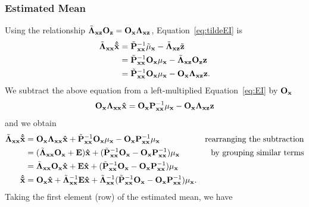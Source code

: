\subsubsection{Estimated Mean}
Using the relationship ${\tilde{\bf \Lambda}}_{\bf xz}{\bf O}_{\bf z}={\bf O}_{\bf x}{\bf \Lambda}_{\bf xz}$, Equation~\eqref{eq:tildeEI} is
\begin{equation}
\begin{split}
\tilde{\bf \Lambda}_{\bf xx}{\bf{\hat{\tilde x}}}&=\tilde{\bf P}_{\bf xx}^{-1}\tilde\mu_{\bf x}-\tilde{\bf \Lambda}_{\bf xz}\tilde{\bf z} \\
&=\tilde{\bf P}_{\bf xx}^{-1}{\bf O}_{\bf x}\mu_{\bf x}-\tilde{\bf \Lambda}_{\bf xz}{\bf O}_{\bf z}{\bf z} \\
&=\tilde{\bf P}_{\bf xx}^{-1}{\bf O}_{\bf x}\mu_{\bf x}-{\bf O}_{\bf x}{\bf \Lambda}_{\bf xz}{\bf z}. \\
\end{split}
\end{equation}
We subtract the above equation from a left-multiplied Equation~\eqref{eq:EI} by ${\bf O}_{\bf x}$
\begin{equation}
{\bf O}_{\bf x}{\bf \Lambda}_{\bf xx}{\bf{\hat x}}={\bf O}_{\bf x}{\bf P}_{\bf xx}^{-1}\mu_{\bf x}-{\bf O}_{\bf x}{\bf \Lambda}_{\bf xz}{\bf z}
\end{equation}
and we obtain
\begin{align*}
\tilde{\bf \Lambda}_{\bf xx}{\bf{\hat{\tilde x}}}&={\bf O}_{\bf x}{\bf \Lambda}_{\bf xx}{\bf{\hat{x}}}+\tilde{\bf P}_{\bf xx}^{-1}{\bf O}_{\bf x}\mu_{\bf x}-{\bf O}_{\bf x}{\bf P}_{\bf xx}^{-1}\mu_{\bf x} & \textrm{rearranging the subtraction}\\
&=({\tilde{\bf \Lambda}}_{\bf xx}{\bf O}_{\bf x}+{\bf E}){\bf{\hat{x}}}+(\tilde{\bf P}_{\bf xx}^{-1}{\bf O}_{\bf x}-{\bf O}_{\bf x}{\bf P}_{\bf xx}^{-1})\mu_{\bf x} & \textrm{by grouping similar terms}\\
&={\tilde{\bf \Lambda}}_{\bf xx}{\bf O}_{\bf x}{\bf{\hat{x}}}+{\bf E}{\bf{\hat{x}}}+(\tilde{\bf P}_{\bf xx}^{-1}{\bf O}_{\bf x}-{\bf O}_{\bf x}{\bf P}_{\bf xx}^{-1})\mu_{\bf x} &\\
{\bf{\hat{\tilde x}}}&={\bf O}_{\bf x}{\bf{\hat{x}}}+\tilde{\bf \Lambda}_{\bf xx}^{-1}{\bf E}{\bf{\hat{x}}}+\tilde{\bf \Lambda}_{\bf xx}^{-1}(\tilde{\bf P}_{\bf xx}^{-1}{\bf O}_{\bf x}-{\bf O}_{\bf x}{\bf P}_{\bf xx}^{-1})\mu_{\bf x}. &\\
\end{align*}
Taking the first element (row) of the estimated mean, we have
